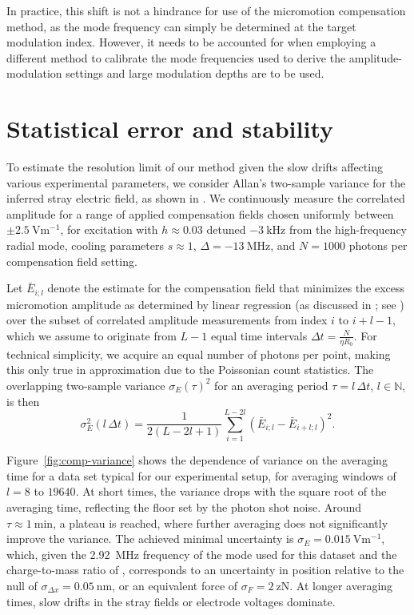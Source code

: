 \documentclass[pra,twocolumn]{revtex4-2}
\begin{document}
In practice, this shift is not a hindrance for use of the micromotion compensation method, as the mode frequency can simply be determined at the target modulation index.
However, it needs to be accounted for when employing a different method to calibrate the mode frequencies used to derive the amplitude-modulation settings and large modulation depths are to be used.


\section{Statistical error and stability}
\label{sec:stability}

To estimate the resolution limit of our method given the slow drifts affecting various experimental parameters, we consider Allan's two-sample variance for the inferred stray electric field, as shown in .
We continuously measure the correlated amplitude for a range of applied compensation fields chosen uniformly between $\pm\SI{2.5}{\volt \metre^{-1}}$, for excitation with $h \approx 0.03$ detuned $\SI{-3}{\kilo\hertz}$ from the high-frequency radial mode, cooling parameters $s \approx 1$, $\Delta = \SI{-13}{\mega\hertz}$, and $N = \num{1000}$ photons per compensation field setting.

Let $\bar{E}_{i;l}$ denote the estimate for the compensation field that minimizes the excess micromotion amplitude as determined by linear regression (as discussed in ; see ) over the subset of correlated amplitude measurements from index $i$ to $i + l - 1$, which we assume to originate from $L - 1$ equal time intervals $\Delta t = \frac{N}{\eta R_0}$.
For technical simplicity, we acquire an equal number of photons per point, making this only true in approximation due to the Poissonian count statistics.
The overlapping two-sample variance ${\sigma_E(\tau)}^2$ for an averaging period $\tau = l\, \Delta t$, $l \in \mathbb{N}$, is then
\begin{equation}
	\sigma_E^2(l\, \Delta t) = \frac{1}{2 (L - 2 l + 1)} \sum_{i = 1}^{L - 2l} \left(\bar{E}_{i; l} - \bar{E}_{i + l; l}\right)^2.
\end{equation}

Figure~\ref{fig:comp-variance} shows the dependence of variance on the averaging time for a data set typical for our experimental setup, for averaging windows of $l = 8$ to $\num{19640}$.
At short times, the variance drops with the square root of the averaging time, reflecting the floor set by the photon shot noise.
Around $\tau \approx \SI{1}{\minute}$, a plateau is reached, where further averaging does not significantly improve the variance.
The achieved minimal uncertainty is  $\sigma_E = \SI{0.015}{\volt \metre^{-1}}$, which, given the \SI{2.92}{\mega\hertz} frequency of the mode used for this dataset and the charge-to-mass ratio of \srplus{}, corresponds to an uncertainty in position relative to the \RF{} null of  $\sigma_{\Delta x} = \SI{0.05}{\nano\metre}$, or an equivalent force of $\sigma_F = \SI{2}{\zepto\newton}$.
At longer averaging times, slow drifts in the stray fields or electrode voltages dominate.
\end{document}
